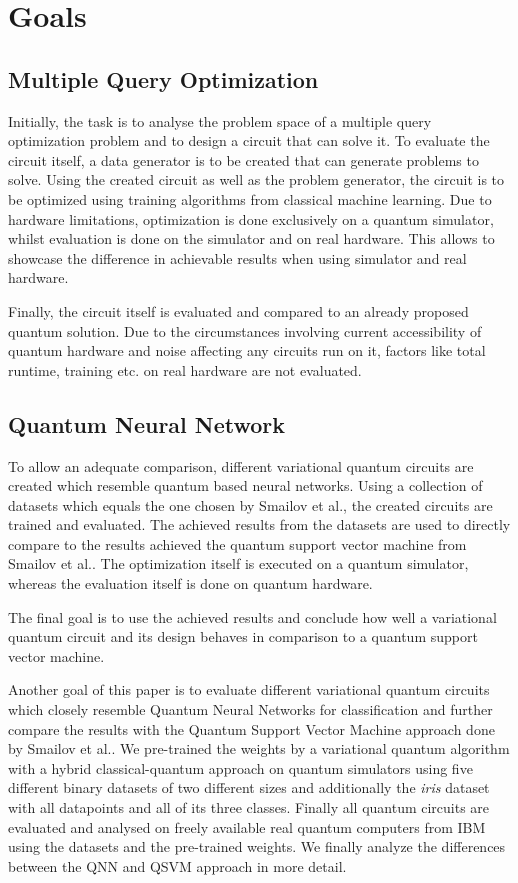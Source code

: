 \section{Goals}

\subsection{Multiple Query Optimization}
Initially, the task is to analyse the problem space of a multiple query optimization problem and to design a circuit that can solve it. To evaluate the circuit itself, a data generator is to be created that can generate problems to solve. 
Using the created circuit as well as the problem generator, the circuit is to be optimized using training algorithms from classical machine learning. Due to hardware limitations, optimization is done exclusively on a quantum simulator, whilst evaluation is done on the simulator and on real hardware. This allows to showcase the difference in achievable results when using simulator and real hardware.\par
Finally, the circuit itself is evaluated and compared to an already proposed quantum solution\cite{fankhauser_multiple_2021}. Due to the circumstances involving current accessibility of quantum hardware and noise affecting any circuits run on it, factors like total runtime, training etc. on real hardware are not evaluated.

\subsection{Quantum Neural Network}
To allow an adequate comparison, different variational quantum circuits are created which resemble quantum based neural networks. Using a collection of datasets which equals the one chosen by Smailov et al.\cite{smailovQuantumMachineLearning2021}, the created circuits are trained and evaluated. The achieved results from the datasets are used to directly compare to the results achieved the quantum support vector machine from Smailov et al.\cite{smailovQuantumMachineLearning2021}. The optimization itself is executed on a quantum simulator, whereas the evaluation itself is done on quantum hardware. \par
The final goal is to use the achieved results and conclude how well a variational quantum circuit and its design behaves in comparison to a quantum support vector machine.

Another goal of this paper is to evaluate different variational quantum circuits which closely resemble Quantum Neural Networks for classification and further compare the results with the Quantum Support Vector Machine approach done by Smailov et al.\cite{smailovQuantumMachineLearning2021}. We pre-trained the weights by a variational quantum algorithm with a hybrid classical-quantum approach on quantum simulators using five different binary datasets of two different sizes and additionally the \textit{iris} dataset with all datapoints and all of its three classes. Finally all quantum circuits are evaluated and analysed on freely available real quantum computers from IBM using the datasets and the pre-trained weights. We finally analyze the differences between the QNN and QSVM approach in more detail.

\clearpage
